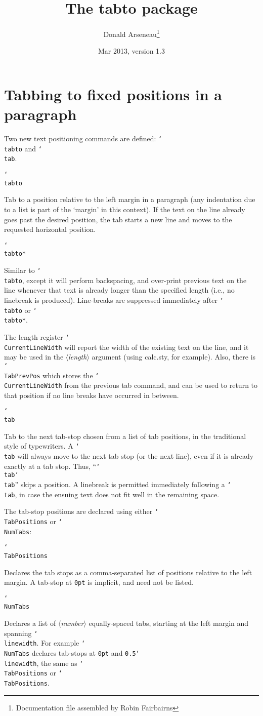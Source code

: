\documentclass[11pt,a4paper]{article}
\makeatletter
\newcommand\cs[1]{\texttt{\char`\\#1}}
\renewcommand\arg[1]{\nolinebreak[2]\mbox{\texttt{\string{#1\string}}}}
\newcommand\sarg{\texttt{*}}
\newcommand\meta[1]{\mbox{\ensuremath{\langle}\textit{#1}\ensuremath{\rangle}}}
\newcommand\prototype[1]{\par\pagebreak[1]\bigskip\begingroup
   \noindent\samepage #1\par \nopagebreak \smallskip \endgroup \@afterheading}
\let\Package\textsf
\makeatother
\begin{document}
\title{The \Package{tabto} package}
\author{Donald Arseneau\thanks{Documentation file assembled by Robin
    Fairbairns}}
\date{Mar 2013, version 1.3}
\maketitle

\section*{Tabbing to fixed positions in a paragraph}

Two new text positioning commands are defined: \cs{tabto} and \cs{tab}.

\prototype{\cs{tabto}\arg{\meta{length}}}

Tab to a position relative to the left margin in a paragraph
(any indentation due to a list is part of the `margin' in this
context).  If the text on the line already goes past the desired
position, the tab starts a new line and moves to the requested
horizontal position.


\prototype{\cs{tabto}\sarg\arg{\meta{length}}}

Similar to \cs{tabto}, except it will perform backspacing, and 
over-print previous text on the line whenever that text is already
longer than the specified length (i.e., no linebreak is produced).
Line-breaks are suppressed immediately after \cs{tabto} or \cs{tabto*}.

The length register \cs{CurrentLineWidth} will report the width
of the existing text on the line, and it may be used in the
\meta{length} argument (using calc.sty, for example). Also, there
is \cs{TabPrevPos} which stores the \cs{CurrentLineWidth} from the
previous tab command, and can be used to return to that position
if no line breaks have occurred in between.

\prototype{\cs{tab}}

Tab to the next tab-stop chosen from a list of tab positions, in
the traditional style of typewriters.  A \cs{tab} will always move
to the next tab stop (or the next line), even if it is already
exactly at a tab stop. Thus, ``\cs{tab}\cs{tab}'' skips a position.  A
linebreak is permitted immediately following a \cs{tab}, in case the
ensuing text does not fit well in the remaining space.

The tab-stop positions are declared using either \cs{TabPositions}
or \cs{NumTabs}:

\prototype{\cs{TabPositions}\arg{\meta{length}, \meta{length},
             \textrm{\dots}\meta{length}}}

Declares the tab stops as a comma-separated list of positions 
relative to the left margin. A tab-stop at \texttt{0pt} is implicit, and 
need not be listed.

\prototype{\cs{NumTabs}\arg{\meta{number}}}

Declares a list of \meta{number} equally-spaced tabs, starting at the
left margin and spanning \cs{linewidth}.  For example
\cs{NumTabs}\arg{2} declares tab-stops at \texttt{0pt} and
\texttt{0.5}\cs{linewidth}, the same as
\cs{TabPositions}\arg{0pt, 0.5\cs{linewidth}}
or \cs{TabPositions}\arg{0.5\cs{linewidth}}.
\end{document}
